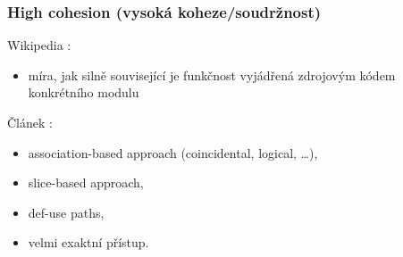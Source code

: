 
\subsubsection{High cohesion (vysoká koheze/soudržnost)}

Wikipedia \cite{wiki:cohesion}:
\begin{itemize}
\item míra, jak silně související je funkčnost vyjádřená zdrojovým kódem konkrétního modulu
\end{itemize}

Článek \cite{Kang:1996:DCM:872750.873361}:
\begin{itemize}
\item association-based approach (coincidental, logical, \ldots),
\item slice-based approach,
\item def-use paths,
\item velmi exaktní přístup.
\end{itemize}

